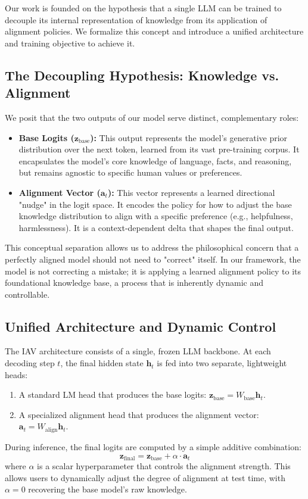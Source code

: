 \documentclass{article} %
\begin{document}
Our work is founded on the hypothesis that a single LLM can be trained to decouple its internal representation of knowledge from its application of alignment policies. We formalize this concept and introduce a unified architecture and training objective to achieve it.

\subsection{The Decoupling Hypothesis: Knowledge vs. Alignment}

We posit that the two outputs of our model serve distinct, complementary roles:
\begin{itemize}
    \item \textbf{Base Logits ($\mathbf{z}_{\text{base}}$):} This output represents the model's generative prior distribution over the next token, learned from its vast pre-training corpus. It encapsulates the model's core knowledge of language, facts, and reasoning, but remains agnostic to specific human values or preferences.
    \item \textbf{Alignment Vector ($\mathbf{a}_t$):} This vector represents a learned directional "nudge" in the logit space. It encodes the policy for how to adjust the base knowledge distribution to align with a specific preference (e.g., helpfulness, harmlessness). It is a context-dependent delta that shapes the final output.
\end{itemize}
This conceptual separation allows us to address the philosophical concern that a perfectly aligned model should not need to "correct" itself. In our framework, the model is not correcting a mistake; it is applying a learned alignment policy to its foundational knowledge base, a process that is inherently dynamic and controllable.

\subsection{Unified Architecture and Dynamic Control}

The IAV architecture consists of a single, frozen LLM backbone. At each decoding step $t$, the final hidden state $\mathbf{h}_t$ is fed into two separate, lightweight heads:
\begin{enumerate}
    \item A standard LM head that produces the base logits: $\mathbf{z}_{\text{base}} = W_{\text{base}}\mathbf{h}_t$.
    \item A specialized alignment head that produces the alignment vector: $\mathbf{a}_t = W_{\text{align}}\mathbf{h}_t$.
\end{enumerate}
During inference, the final logits are computed by a simple additive combination:
\begin{equation}
\mathbf{z}_{\text{final}} = \mathbf{z}_{\text{base}} + \alpha \cdot \mathbf{a}_t
\end{equation}
where $\alpha$ is a scalar hyperparameter that controls the alignment strength. This allows users to dynamically adjust the degree of alignment at test time, with $\alpha=0$ recovering the base model's raw knowledge.
\end{document}
